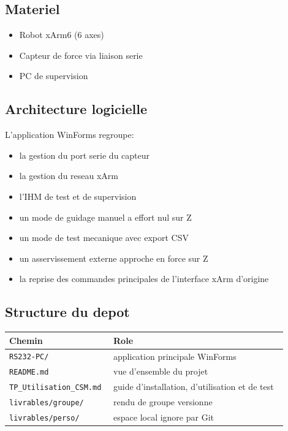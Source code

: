 \documentclass[11pt,a4paper]{article}
\begin{document}
\subsection{Materiel}

\begin{itemize}
    \item Robot xArm6 (6 axes)
    \item Capteur de force via liaison serie
    \item PC de supervision
\end{itemize}

\subsection{Architecture logicielle}

L'application WinForms regroupe:

\begin{itemize}
    \item la gestion du port serie du capteur
    \item la gestion du reseau xArm
    \item l'IHM de test et de supervision
    \item un mode de guidage manuel a effort nul sur Z
    \item un mode de test mecanique avec export CSV
    \item un asservissement externe approche en force sur Z
    \item la reprise des commandes principales de l'interface xArm d'origine
\end{itemize}

\subsection{Structure du depot}

\begin{longtable}{|p{0.30\linewidth}|p{0.60\linewidth}|}
\hline
\textbf{Chemin} & \textbf{Role} \\
\hline
\texttt{RS232-PC/} & application principale WinForms \\
\hline
\texttt{README.md} & vue d'ensemble du projet \\
\hline
\texttt{TP\_Utilisation\_CSM.md} & guide d'installation, d'utilisation et de test \\
\hline
\texttt{livrables/groupe/} & rendu de groupe versionne \\
\hline
\texttt{livrables/perso/} & espace local ignore par Git \\
\hline
\end{longtable}
\end{document}
